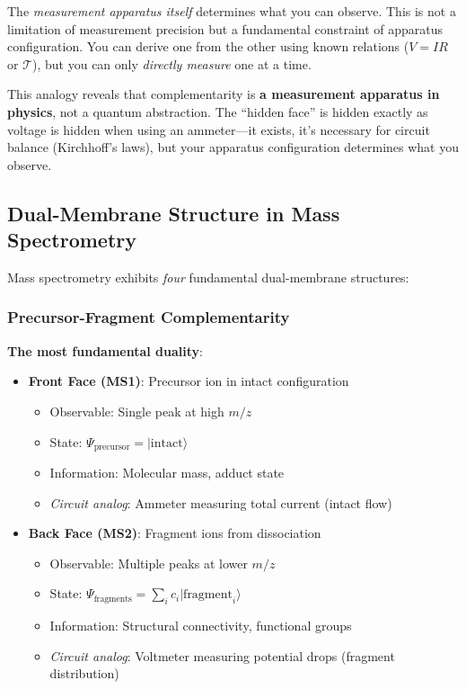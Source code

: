 \documentclass[twocolumn,10pt,a4paper]{article}
\theoremstyle{definition}
\theoremstyle{remark}
\begin{document}
The \emph{measurement apparatus itself} determines what you can observe. This is not a limitation of measurement precision but a fundamental constraint of apparatus configuration. You can derive one from the other using known relations ($V = IR$ or $\mathcal{T}$), but you can only \emph{directly measure} one at a time.

This analogy reveals that complementarity is \textbf{a measurement apparatus in physics}, not a quantum abstraction. The ``hidden face'' is hidden exactly as voltage is hidden when using an ammeter---it exists, it's necessary for circuit balance (Kirchhoff's laws), but your apparatus configuration determines what you observe.

\subsection{Dual-Membrane Structure in Mass Spectrometry}

Mass spectrometry exhibits \emph{four} fundamental dual-membrane structures:

\subsubsection{Precursor-Fragment Complementarity}

\textbf{The most fundamental duality}:

\begin{itemize}
\item \textbf{Front Face (MS1)}: Precursor ion in intact configuration
  \begin{itemize}
  \item Observable: Single peak at high $m/z$
  \item State: $\Psi_{\text{precursor}} = |\text{intact}\rangle$
  \item Information: Molecular mass, adduct state
  \item \emph{Circuit analog}: Ammeter measuring total current (intact flow)
  \end{itemize}

\item \textbf{Back Face (MS2)}: Fragment ions from dissociation
  \begin{itemize}
  \item Observable: Multiple peaks at lower $m/z$
  \item State: $\Psi_{\text{fragments}} = \sum_i c_i |\text{fragment}_i\rangle$
  \item Information: Structural connectivity, functional groups
  \item \emph{Circuit analog}: Voltmeter measuring potential drops (fragment distribution)
  \end{itemize}
\end{itemize}
\end{document}
